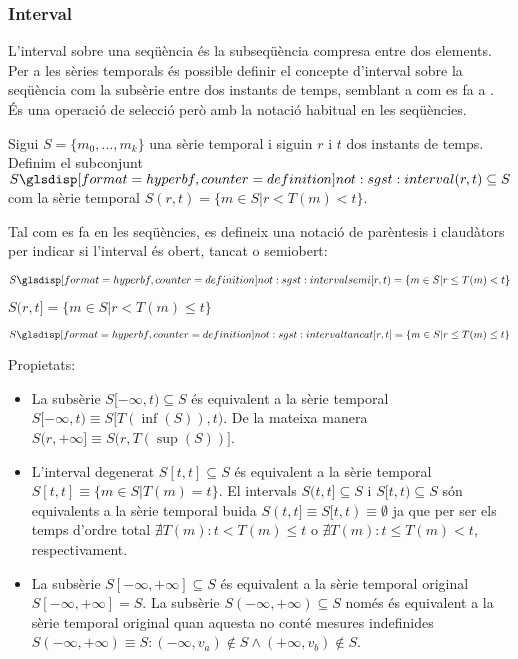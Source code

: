 \subsubsection{Interval}

L'interval sobre una seqüència és la subseqüència compresa entre dos
elements.  Per a les sèries temporals és possible definir el concepte
d'interval sobre la seqüència com la subsèrie entre dos instants de
temps, semblant a com es fa a \cite{last:keogh,last:hetland}.  És una
operació de selecció però amb la notació habitual en les seqüències.


\begin{definition}[Interval]
  \label{def:model:st-interval}
  Sigui $S=\{m_0, \ldots, m_k\}$ una sèrie temporal i siguin $r$ i $t$
  dos instants de temps. Definim el subconjunt
  $S\glsdispdef{not:sgst:interval}{(r,t)} \subseteq S$ com la sèrie
  temporal $S(r,t)=\{m\in S | r<T(m)<t\}$.

  Tal com es fa en les seqüències, es defineix una notació de
  parèntesis i claudàtors per indicar si l'interval és obert, tancat o
  semiobert:

  $S\glsdispdef{not:sgst:intervalsemi}{[r,t)}=\{m\in S  | r\leq T(m)< t\}$

  $S(r,t]=\{m\in S  | r<T(m)\leq t\}$

  $S\glsdispdef{not:sgst:intervaltancat}{[r,t]}=\{m\in S | r\leq
  T(m)\leq t\}$
\end{definition}


Propietats:
\begin{itemize}
\item La subsèrie $S[-\infty,t)\subseteq S$ és equivalent a la sèrie
  temporal $S[-\infty,t) \equiv S[T(\inf(S)),t)$. De la mateixa manera
  $S(r,+\infty] \equiv S(r,T(\sup(S))]$.

\item L'interval degenerat $S[t,t]\subseteq S$ és equivalent a la
  sèrie temporal $S[t,t] \equiv \{m\in S | T(m)=t \}$. El intervals
  $S(t,t]\subseteq S$ i $S[t,t)\subseteq S$ són equivalents a la sèrie
  temporal buida $S(t,t] \equiv S[t,t) \equiv \emptyset$ ja que per
  ser els temps d'ordre total $\nexists T(m): t < T(m) \leq t$ o
  $\nexists T(m): t \leq T(m) < t$, respectivament. 

\item La subsèrie $S[-\infty,+\infty] \subseteq S$ és equivalent a la
  sèrie temporal original $S[-\infty,+\infty] = S$. La subsèrie
  $S(-\infty,+\infty) \subseteq S$ només és equivalent a la sèrie
  temporal original quan aquesta no conté mesures indefinides
  $S(-\infty,+\infty) \equiv S: (-\infty,v_a)\notin S \wedge
  (+\infty,v_b)\notin S$.
\end{itemize}




